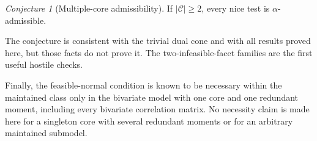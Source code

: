 \documentclass[12pt]{article}
\theoremstyle{definition}
\theoremstyle{remark}
\newtheorem{conjecture}[theorem]{Conjecture}
\newcommand{\cC}{\mathcal C}
\newcommand{\1}{\mathbf 1}
\begin{document}
\begin{conjecture}[Multiple-core admissibility]
If $|\cC|\ge2$, every nice test is $\alpha$-admissible.
\end{conjecture}

The conjecture is consistent with the trivial dual cone and with all results
proved here, but those facts do not prove it.  The two-infeasible-facet
families are the first useful hostile checks.

Finally, the feasible-normal condition is known to be necessary within the
maintained class only in the bivariate model with one core and one redundant
moment, including every bivariate correlation matrix.  No necessity claim is
made here for a singleton core with several redundant moments or for an
arbitrary maintained submodel.
\end{document}
